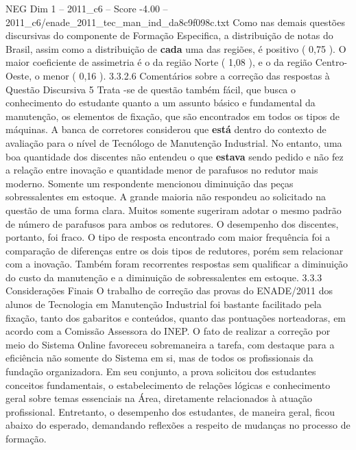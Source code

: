 \begin{textsample}{NEG Dim 1 – 2011\_c6 – Score -4.00 – 2011\_c6/enade\_2011\_tec\_man\_ind\_da8c9f098c.txt}
Como nas demais questões discursivas do componente de Formação Especifica, a distribuição de notas do Brasil, assim como a distribuição de \textbf{cada} uma das regiões, é positivo ( 0,75 ).
O maior coeficiente de assimetria é o da região Norte ( 1,08 ), e o da região Centro-Oeste, o menor ( 0,16 ). 3.3.2.6 Comentários sobre a correção das respostas à Questão Discursiva 5 Trata -se de questão também fácil, que busca o conhecimento do estudante quanto a um assunto básico e fundamental da manutenção, os elementos de fixação, que são encontrados em todos os tipos de máquinas.
A banca de corretores considerou que \textbf{está} dentro do contexto de avaliação para o nível de Tecnólogo de Manutenção Industrial.
No entanto, uma boa quantidade dos discentes não entendeu o que \textbf{estava} sendo pedido e não fez a relação entre inovação e quantidade menor de parafusos no redutor mais moderno.
Somente um respondente mencionou diminuição das peças sobressalentes em estoque.
A grande maioria não respondeu ao solicitado na questão de uma forma clara.
Muitos somente sugeriram adotar o mesmo padrão de número de parafusos para ambos os redutores.
O desempenho dos discentes, portanto, foi fraco.
O tipo de resposta encontrado com maior frequência foi a comparação de diferenças entre os dois tipos de redutores, porém sem relacionar com a inovação.
Também foram recorrentes respostas sem qualificar a diminuição do custo da manutenção e a diminuição de sobressalentes em estoque. 3.3.3 Considerações Finais O trabalho de correção das provas do ENADE/2011 dos alunos de Tecnologia em Manutenção Industrial foi bastante facilitado pela fixação, tanto dos gabaritos e conteúdos, quanto das pontuações norteadoras, em acordo com a Comissão Assessora do INEP.
O fato de realizar a correção por meio do Sistema Online favoreceu sobremaneira a tarefa, com destaque para a eficiência não somente do Sistema em si, mas de todos os profissionais da fundação organizadora.
Em seu conjunto, a prova solicitou dos estudantes conceitos fundamentais, o estabelecimento de relações lógicas e conhecimento geral sobre temas essenciais na Área, diretamente relacionados à atuação profissional.
Entretanto, o desempenho dos estudantes, de maneira geral, ficou abaixo do esperado, demandando reflexões a respeito de mudanças no processo de formação.

\end{textsample}
